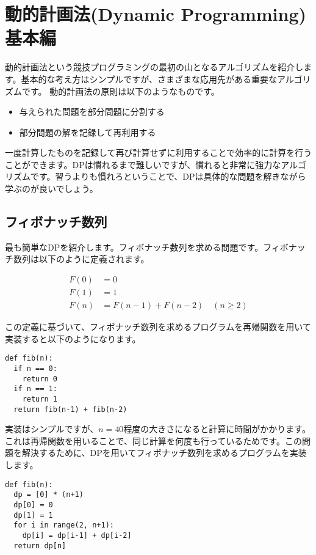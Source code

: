 \section{動的計画法(Dynamic Programming) 基本編}
動的計画法という競技プログラミングの最初の山となるアルゴリズムを紹介します。基本的な考え方はシンプルですが、さまざまな応用先がある重要なアルゴリズムです。
動的計画法の原則は以下のようなものです。

\begin{itemize}
  \item 与えられた問題を部分問題に分割する
  \item 部分問題の解を記録して再利用する
\end{itemize}

一度計算したものを記録して再び計算せずに利用することで効率的に計算を行うことができます。DPは慣れるまで難しいですが、慣れると非常に強力なアルゴリズムです。習うよりも慣れろということで、DPは具体的な問題を解きながら学ぶのが良いでしょう。

\subsection{フィボナッチ数列}
最も簡単なDPを紹介します。フィボナッチ数列を求める問題です。フィボナッチ数列は以下のように定義されます。

\begin{align*}
  F(0) &= 0 \\
  F(1) &= 1 \\
  F(n) &= F(n-1) + F(n-2) \quad (n \geq 2)
\end{align*}

この定義に基づいて、フィボナッチ数列を求めるプログラムを再帰関数を用いて実装すると以下のようになります。
\begin{lstlisting}[caption=再帰関数を用いたフィボナッチ数列の実装, frame=TRBL, label={rec_fib}]
def fib(n):
  if n == 0:
    return 0
  if n == 1:
    return 1
  return fib(n-1) + fib(n-2)
\end{lstlisting}

実装はシンプルですが、$n = 40$程度の大きさになると計算に時間がかかります。これは再帰関数を用いることで、同じ計算を何度も行っているためです。この問題を解決するために、DPを用いてフィボナッチ数列を求めるプログラムを実装します。

\begin{lstlisting}[caption=DPを用いたフィボナッチ数列の実装, frame=TRBL, label={dp_fib}]
def fib(n):
  dp = [0] * (n+1)
  dp[0] = 0
  dp[1] = 1
  for i in range(2, n+1):
    dp[i] = dp[i-1] + dp[i-2]
  return dp[n]
\end{lstlisting}

